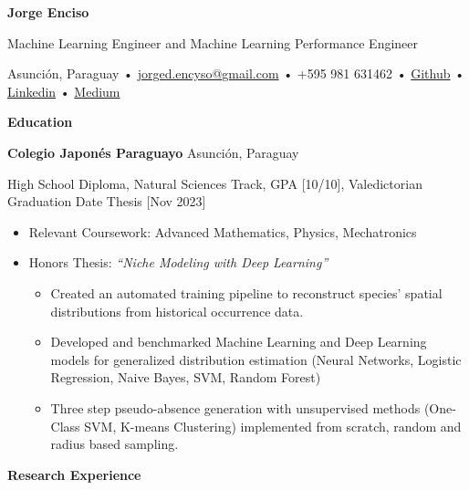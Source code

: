 \documentclass[11pt]{article}
\begin{document}
\begin{center}
    \textbf{Jorge Enciso}\\
    \begin{center}
        Machine Learning Engineer and Machine Learning Performance Engineer
    \end{center}
    \hrulefill
\end{center}

\begin{center}
    Asunción, Paraguay • \href{mailto:jorged.encyso@gmail.com}{jorged.encyso@gmail.com} • +595 981 631462 • \href{https://github.com/jorgedavyd}{Github} • \href{https://linkedin.com/in/jorge-david-enciso-martínez-149977265}{Linkedin} • \href{https://medium.com/@jorged.encyso}{Medium}
\end{center}

\vspace{0.5pt}

\begin{center}
    \textbf{Education}
\end{center}
\textbf{Colegio Japonés Paraguayo} \hfill Asunción, Paraguay

High School Diploma, Natural Sciences Track, GPA [10/10], Valedictorian \hfill Graduation Date Thesis [Nov 2023]

\begin{itemize}%
    \item Relevant Coursework: Advanced Mathematics, Physics, Mechatronics
    \item Honors Thesis: \textit{“Niche Modeling with Deep Learning”}
        \begin{itemize}
            \item Created an automated training pipeline to reconstruct species’ spatial distributions from historical occurrence data.
            \item Developed and benchmarked Machine Learning and Deep Learning models for generalized distribution estimation (Neural Networks, Logistic Regression, Naive Bayes, SVM, Random Forest)
            \item Three step pseudo-absence generation with unsupervised methods (One-Class SVM, K-means Clustering) \cite{pseudo} implemented from scratch, random and radius based sampling.
        \end{itemize}
\end{itemize}

\vspace{12pt}

\begin{center}
    \textbf{Research Experience}
\end{center}
\end{document}
